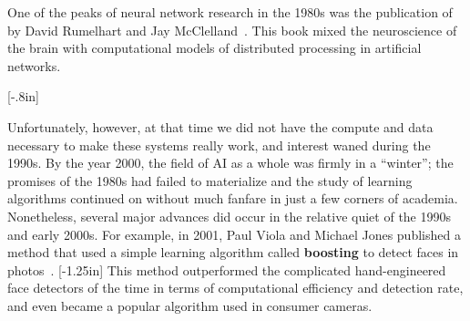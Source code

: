 One of the peaks of neural network research in the 1980s was the publication of  by David Rumelhart and Jay McClelland~\cite{Rumelhart86}. This book mixed the neuroscience of the brain with computational models of distributed processing in artificial networks. 

[-.8in]

Unfortunately, however, at that time we did not have the compute and data necessary to make these systems really work, and interest waned during the 1990s. By the year 2000, the field of AI as a whole was firmly in a ``winter''; the promises of the 1980s had failed to materialize and the study of learning algorithms continued on without much fanfare in just a few corners of academia. Nonetheless, several major advances did occur in the relative quiet of the 1990s and early 2000s. 
For example, in 2001, Paul Viola and Michael Jones published a method that used a simple learning algorithm called {\bf boosting} to detect faces in photos~\cite{Viola01}. 
[-1.25in]
This method outperformed the complicated hand-engineered face detectors of the time in terms of computational efficiency and detection rate, and even became a popular algorithm used in consumer cameras.



